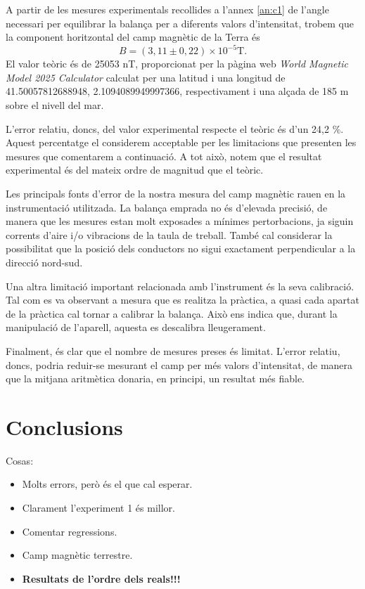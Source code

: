 \documentclass[a4paper,10.5pt]{report}
\begin{document}
A partir de les mesures experimentals recollides a l'annex \ref{an:c1} de l'angle necessari per equilibrar la balança per a diferents valors d'intensitat, trobem que la component horitzontal del camp magnètic de la Terra és
\begin{equation}
	B=(3,11 \pm 0,22)\times 10^{-5} \text{T}.
\end{equation}
El valor teòric és de 25053 nT, proporcionat per la pàgina web \textit{World Magnetic Model 2025 Calculator}\cite{ref2} calculat per una latitud i una longitud de 41.50057812688948, 2.1094089949997366, respectivament i una alçada de 185 m sobre el nivell del mar. 

L'error relatiu, doncs, del valor experimental respecte el teòric és d'un 24,2 \%. Aquest percentatge el considerem acceptable per les limitacions que presenten les mesures que comentarem a continuació. A tot això, notem que el resultat experimental és del mateix ordre de magnitud que el teòric.

Les principals fonts d'error de la nostra mesura del camp magnètic rauen en la instrumentació utilitzada. La balança emprada no és d'elevada precisió, de manera que les mesures estan molt exposades a mínimes pertorbacions, ja siguin corrents d'aire i/o vibracions de la taula de treball. També cal considerar la possibilitat que la posició dels conductors no sigui exactament perpendicular a la direcció nord-sud.

Una altra limitació important relacionada amb l'instrument és la seva calibració. Tal com es va observant a mesura que es realitza la pràctica, a quasi cada apartat de la pràctica cal tornar a calibrar la balança. Això ens indica que, durant la manipulació de l'aparell, aquesta es descalibra lleugerament.

Finalment, és clar que el nombre de mesures preses és limitat. L'error relatiu, doncs, podria reduir-se mesurant el camp per més valors d'intensitat, de manera que la mitjana aritmètica donaria, en principi, un resultat més fiable.


\section{Conclusions}
Cosas:
\begin{itemize}
	\item Molts errors, però és el que cal esperar.
	\item Clarament l'experiment 1 és millor.
	\item Comentar regressions.
	\item Camp magnètic terrestre.
	\item \textbf{Resultats de l'ordre dels reals!!!}
\end{itemize}
\end{document}
